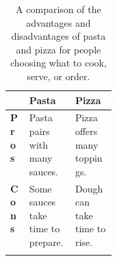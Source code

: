\documentclass{article}
\begin{document}
\begin{xltabular}{\linewidth}{p{0.185\linewidth}|X|X}
                & \textbf{Pasta}                    & \textbf{Pizza}               \\
  \hline
  \textbf{Pros} & Pasta pairs with many sauces.     & Pizza offers many toppings.  \\
  \textbf{Cons} & Some sauces take time to prepare. & Dough can take time to rise. \\
  \caption{A comparison of the advantages and disadvantages of pasta and pizza for people choosing what to cook, serve, or order.} \\
\end{xltabular}
\end{document}
